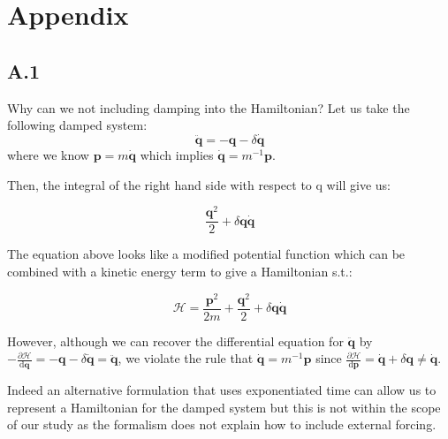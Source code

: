 \documentclass{article}
\begin{document}
\section*{Appendix}

\subsection*{A.1}

Why can we not including damping into the Hamiltonian? Let us take the following damped system:
\begin{equation}
\ddot{\mathbf{q}} = -\mathbf{q} - \delta\dot{\mathbf{q}}
\end{equation}
where we know $\mathbf{p}=m\dot{\mathbf{q}}$ which implies $\dot{\mathbf{q}} = m^{-1}\mathbf{p}$.

Then, the integral of the right hand side with respect to q will give us:

\begin{equation}
\frac{\mathbf{q}^2}{2} + \delta \mathbf{q} \dot{\mathbf{q}}
\end{equation}

The equation above looks like a modified potential function which can be combined with a kinetic energy term to give a Hamiltonian s.t.:

\begin{equation}
\mathcal{H} =\frac{ \mathbf{p}^2}{2m} + \frac{\mathbf{q}^2}{2} + \delta \mathbf{q} \dot{\mathbf{q}}
\end{equation}

However, although we can recover the differential equation for $\ddot{\mathbf{q}}$ by $-\frac{\partial\mathcal{H}}{\mathrm{d}\mathbf{q}}  =-\mathbf{q} - \delta\dot{\mathbf{q}} = \ddot{\mathbf{q}}$, we violate the rule that $\dot{\mathbf{q}} = m^{-1}\mathbf{p}$ since $ \frac{\partial\mathcal{H}}{\mathrm{d}\mathbf{p}} =  \dot{\mathbf{q}} +\delta \mathbf{q} \neq \dot{\mathbf{q}} $.

Indeed an alternative formulation that uses exponentiated time can allow us to represent a Hamiltonian for the damped system but this is not within the scope of our study as the formalism does not explain how to include external forcing.
\end{document}

